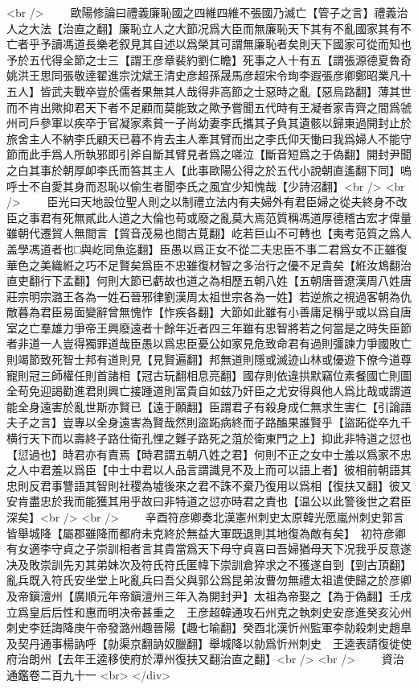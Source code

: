 <br />
　　歐陽修論曰禮義廉恥國之四維四維不張國乃滅亡【管子之言】禮義治人之大法【治直之翻】廉恥立人之大節况爲大臣而無廉恥天下其有不亂國家其有不亡者乎予讀馮道長樂老叙見其自述以爲榮其可謂無廉恥者矣則天下國家可從而知也予於五代得全節之士三【謂王彦章裴約劉仁瞻】死事之人十有五【謂張源德夏魯奇姚洪王思同張敬逹翟進宗沈斌王清史彦超孫晟馬彦超宋令珣李遐張彦卿鄭昭業凡十五人】皆武夫戰卒豈於儒者果無其人哉得非高節之士惡時之亂【惡烏路翻】薄其世而不肯出歟抑君天下者不足顧而莫能致之歟予嘗聞五代時有王凝者家青齊之間爲虢州司戶參軍以疾卒于官凝家素貧一子尚幼妻李氏攜其子負其遺骸以歸東過開封止於旅舍主人不納李氏顧天已暮不肯去主人牽其臂而出之李氏仰天慟曰我爲婦人不能守節而此手爲人所執邪即引斧自斷其臂見者爲之嗟泣【斷音短爲之于偽翻】開封尹聞之白其事於朝厚卹李氏而笞其主人【此事歐陽公得之於五代小說朝直遙翻下同】嗚呼士不自愛其身而忍恥以偷生者聞李氏之風宜少知愧哉【少詩沼翻】<br />
<br />
　　臣光曰天地設位聖人則之以制禮立法内有夫婦外有君臣婦之從夫終身不改臣之事君有死無貳此人道之大倫也苟或廢之亂莫大焉范質稱馮道厚德稽古宏才偉量雖朝代遷貿人無間言【貿音茂易也間古莧翻】屹若巨山不可轉也【夷考范質之爲人盖學馮道者也□與屹同魚迄翻】臣愚以爲正女不從二夫忠臣不事二君爲女不正雖復華色之美織絍之巧不足賢矣爲臣不忠雖復材智之多治行之優不足貴矣【絍汝鴆翻治直吏翻行下孟翻】何則大節已虧故也道之為相歷五朝八姓【五朝唐晉遼漢周八姓唐莊宗明宗潞王各為一姓石晉邪律劉漢周太祖世宗各為一姓】若逆旅之視過客朝為仇敵暮為君臣易面變辭曾無愧怍【怍疾各翻】大節如此雖有小善庸足稱乎或以爲自唐室之亡羣雄力爭帝王興廢遠者十餘年近者四三年雖有忠智將若之何當是之時失臣節者非道一人豈得獨罪道哉臣愚以爲忠臣憂公如家見危致命君有過則彊諫力爭國敗亡則竭節致死智士邦有道則見【見賢遍翻】邦無道則隱或滅迹山林或優遊下僚今道尊寵則冠三師權任則首諸相【冠古玩翻相息亮翻】國存則依違拱默竊位素餐國亡則圖全苟免迎謁勸進君則興亡接踵道則富貴自如兹乃奸臣之尤安得與他人爲比哉或謂道能全身遠害於亂世斯亦賢已【遠于願翻】臣謂君子有殺身成仁無求生害仁【引論語夫子之言】豈專以全身遠害為賢哉然則盜跖病終而子路醢果誰賢乎【盜跖從卒九千横行天下而以壽終子路仕衛孔悝之難子路死之菹於衛東門之上】抑此非特道之愆也【愆過也】時君亦有責焉【時君謂五朝八姓之君】何則不正之女中士羞以爲家不忠之人中君羞以爲臣【中士中君以人品言謂識見不及上而可以語上者】彼相前朝語其忠則反君事讐語其智則社稷為墟後來之君不誅不棄乃復用以爲相【復扶又翻】彼又安肯盡忠於我而能獲其用乎故曰非特道之愆亦時君之責也【温公以此警後世之君臣深矣】<br />
<br />
　　辛酉符彦卿奏北漢憲州刺史太原韓光愿嵐州刺史郭言皆舉城降【屬郡雖降而都府未克終於無益大軍既退則其地復為敵有矣】　初符彦卿有女適李守貞之子崇訓相者言其貴當爲天下母守貞喜曰吾婦猶母天下况我乎反意遂决及敗崇訓先刃其弟妹次及符氏符氏匿幃下崇訓倉猝求之不獲遂自剄【剄古頂翻】亂兵既入符氏安坐堂上叱亂兵曰吾父與郭公爲昆弟汝曹勿無禮太祖遣使歸之於彦卿及帝鎭澶州【廣順元年帝鎭澶州三年入為開封尹】太祖為帝娶之【為于偽翻】壬戌立爲皇后后性和惠而明决帝甚重之　王彦超韓通攻石州克之執刺史安彦進癸亥沁州刺史李廷誨降庚午帝發潞州趣晉陽【趣七喻翻】癸酉北漢忻州監軍李勍殺刺史趙臯及契丹通事楊訥呼【勍渠京翻訥奴臘翻】舉城降以勍爲忻州刺史　王逵表請復徙使府治朗州【去年王逵移使府於潭州復扶又翻治直之翻】<br />
<br />
　　資治通鑑卷二百九十一  <br>
   </div> 


